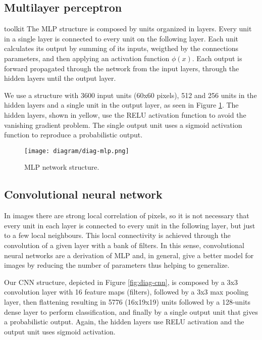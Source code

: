     \subsection{Multilayer perceptron}toolkit
        The MLP structure is composed by units organized in layers. Every unit in a single layer is connected to every unit on the following layer. Each unit calculates its output by summing of its inputs, weigthed by the connections parameters, and then applying an activation function $\phi(x)$. Each output is forward propagated through the network from the input layers, through the hidden layers until the output layer.

        We use a structure with 3600 input units (60x60 pixels), 512 and 256 units in the hidden layers and a single unit in the output layer, as seen in Figure \ref{fig:diag-mlp}. The hidden layers, shown in yellow, use the RELU \cite{nair2010relu} activation function to avoid the vanishing gradient problem. The single output unit uses a sigmoid activation function to reproduce a probabilistic output.

        \begin{figure}
        \centering
        \texttt{[image: diagram/diag-mlp.png]}
        \caption{MLP network structure.}
        \label{fig:diag-mlp}
        \end{figure}

    \subsection{Convolutional neural network}
         In images there are strong local correlation of pixels, so it is not necessary that every unit in each layer is connected to every unit in the following layer, but just to a few local neighbours. This local connectivity is achieved through the convolution of a given layer with a bank of filters. In this sense, convolutional neural networks are a derivation of MLP and, in general, give a better model for images by reducing the number of parameters thus helping to generalize.

        Our CNN structure, depicted in Figure \ref{fig:diag-cnn}, is composed by a 3x3 convolution layer with 16 feature maps (filters), followed by a 3x3 max pooling layer, then flattening resulting in 5776 (16x19x19) units followed by a 128-units dense layer to perform classification, and finally by a single output unit that gives a probabilistic output. Again, the hidden layers use RELU activation and the output unit uses sigmoid activation.

